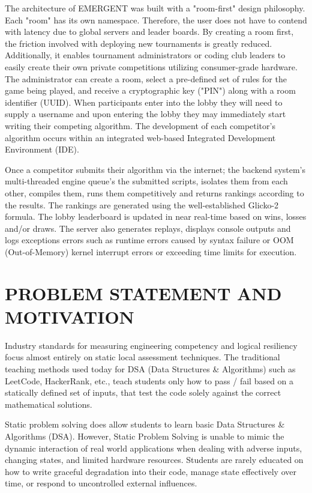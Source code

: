 \documentclass[12pt,a4paper]{report}
\begin{document}
The architecture of EMERGENT was built with a "room-first" design philosophy. Each "room" has its own namespace. Therefore, the user does not have to contend with latency due to global servers and leader boards. By creating a room first, the friction involved with deploying new tournaments is greatly reduced. Additionally, it enables tournament administrators or coding club leaders to easily create their own private competitions utilizing consumer-grade hardware. The administrator can create a room, select a pre-defined set of rules for the game being played, and receive a cryptographic key ("PIN") along with a room identifier (UUID). When participants enter into the lobby they will need to supply a username and upon entering the lobby they may immediately start writing their competing algorithm. The development of each competitor's algorithm occurs within an integrated web-based Integrated Development Environment (IDE). 

Once a competitor submits their algorithm via the internet; the backend system's multi-threaded engine queue's the submitted scripts, isolates them from each other, compiles them, runs them competitively and returns rankings according to the results. The rankings are generated using the well-established Glicko-2 formula. The lobby leaderboard is updated in near real-time based on wins, losses and/or draws. The server also generates replays, displays console outputs and logs exceptions errors such as runtime errors caused by syntax failure or OOM (Out-of-Memory) kernel interrupt errors or exceeding time limits for execution.

\section{PROBLEM STATEMENT AND MOTIVATION}
Industry standards for measuring engineering competency and logical resiliency focus almost entirely on static local assessment techniques. The traditional teaching methods used today for DSA (Data Structures \& Algorithms) such as LeetCode, HackerRank, etc., teach students only how to pass / fail based on a statically defined set of inputs, that test the code solely against the correct mathematical solutions.

Static problem solving does allow students to learn basic Data Structures \& Algorithms (DSA). However, Static Problem Solving is unable to mimic the dynamic interaction of real world applications when dealing with adverse inputs, changing states, and limited hardware resources. Students are rarely educated on how to write graceful degradation into their code, manage state effectively over time, or respond to uncontrolled external influences.
\end{document}
